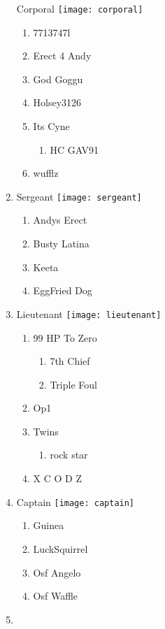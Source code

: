 \documentclass{article}
\begin{document}
\begin{enumerate}[I]
    Corporal \texttt{[image: corporal]}
    \begin{enumerate}[I]
      \item
	7713747l
      \item
	Erect 4 Andy
      \item
	God Goggu
      \item
	Holsey3126
      \item
	Its Cyne
	\begin{enumerate}[I]
	  \item
	    HC GAV91
	\end{enumerate}
      \item
	wufflz
    \end{enumerate}
  \item
    Sergeant \texttt{[image: sergeant]}
    \begin{enumerate}[I]
      \item
	Andys Erect
      \item
	Busty Latina
      \item
	Keeta
      \item
	EggFried Dog
    \end{enumerate}
  \item
    Lieutenant \texttt{[image: lieutenant]}
    \begin{enumerate}[I]
      \item 
	99 HP To Zero
	\begin{enumerate}[I]
	  \item
	    7th Chief
	  \item
	    Triple Foul
	\end{enumerate}
      \item
	Op1
      \item
	Twins
	  \begin{enumerate}[I]
	    \item
	      rock star
	  \end{enumerate}
      \item
	X C O D Z
    \end{enumerate}
  \item
    Captain \texttt{[image: captain]}
    \begin{enumerate}[I]
      \item
	Guinea
      \item
	LuckSquirrel
      \item
	Osf Angelo
      \item
	Osf Waffle
    \end{enumerate}
  \item

\end{enumerate}
\end{document}
